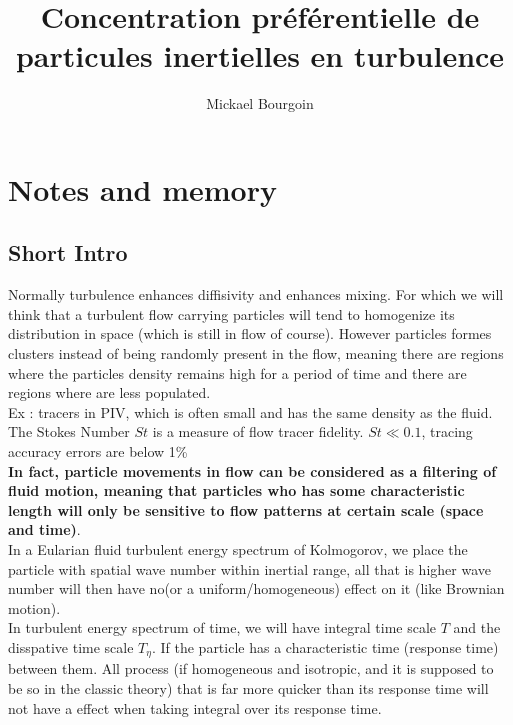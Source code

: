 \documentclass[a4paper,10pt,francais]{article}
\title{Concentration préférentielle de particules inertielles en turbulence}
\author[1]{Mickael Bourgoin}
\affil[1]{LPENSL, Lyon}
\begin{document}
\parindent=0cm
\parskip=3mm

\maketitle

\section{Notes and memory}


\subsection{Short Intro}

Normally turbulence enhances diffisivity and enhances mixing. For which we will think that a turbulent flow carrying particles will tend to homogenize its distribution in space (which is still in flow of course). However particles formes clusters instead of being randomly present in the flow, meaning there are regions where the particles density remains high for a period of time and there are regions where are less populated. \\

Ex : tracers in PIV, which is often small and has the same density as the fluid. The Stokes Number $St$ is a measure of flow tracer fidelity. $St \ll 0.1$, tracing accuracy errors are below 1\% \\

{\bf In fact, particle movements in flow can be considered as a filtering  of fluid motion, meaning that particles who has some characteristic length will only be sensitive to flow patterns at certain scale (space and time)}.\\

In a Eularian fluid turbulent energy spectrum of Kolmogorov, we place the particle with spatial wave number within inertial range, all that is higher wave number will then have no(or a uniform/homogeneous) effect on it (like Brownian motion).\\

In turbulent energy spectrum of time, we will have integral time scale $T$ and the disspative time scale $T_\eta$. If the particle has a characteristic time (response time) between them. All process (if homogeneous and isotropic, and it is supposed to be so in the classic theory) that is far more quicker than its response time will not have a effect when taking integral over its response time.
\end{document}

